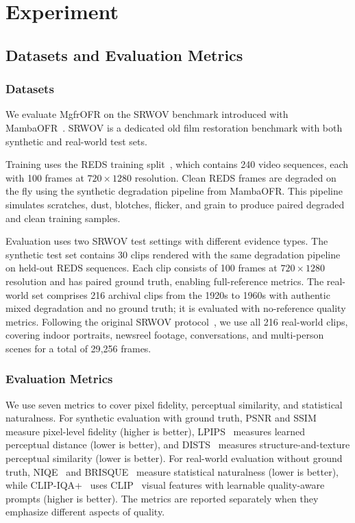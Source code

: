 \section{Experiment}
\label{sec:experiment}

\subsection{Datasets and Evaluation Metrics}
\label{subsec:datasets_metrics}

\subsubsection{Datasets}
\label{subsec:datasets}

We evaluate MgfrOFR on the SRWOV benchmark introduced with MambaOFR~\cite{mao2025mambaofr}. SRWOV is a dedicated old film restoration benchmark with both synthetic and real-world test sets.

Training uses the REDS training split~\cite{nah2019reds}, which contains 240 video sequences, each with 100 frames at $720 \times 1280$ resolution. Clean REDS frames are degraded on the fly using the synthetic degradation pipeline from MambaOFR. This pipeline simulates scratches, dust, blotches, flicker, and grain to produce paired degraded and clean training samples.

Evaluation uses two SRWOV test settings with different evidence types. The synthetic test set contains 30 clips rendered with the same degradation pipeline on held-out REDS sequences. Each clip consists of 100 frames at $720 \times 1280$ resolution and has paired ground truth, enabling full-reference metrics. The real-world set comprises 216 archival clips from the 1920s to 1960s with authentic mixed degradation and no ground truth; it is evaluated with no-reference quality metrics. Following the original SRWOV protocol~\cite{mao2025mambaofr}, we use all 216 real-world clips, covering indoor portraits, newsreel footage, conversations, and multi-person scenes for a total of 29{,}256 frames.

\subsubsection{Evaluation Metrics}
\label{subsec:eval_metrics}

We use seven metrics to cover pixel fidelity, perceptual similarity, and statistical naturalness. For synthetic evaluation with ground truth, PSNR and SSIM~\cite{wang2004ssim} measure pixel-level fidelity (higher is better), LPIPS~\cite{zhang2018lpips} measures learned perceptual distance (lower is better), and DISTS~\cite{ding2020dists} measures structure-and-texture perceptual similarity (lower is better). For real-world evaluation without ground truth, NIQE~\cite{mittal2012niqe} and BRISQUE~\cite{mittal2012brisque} measure statistical naturalness (lower is better), while CLIP-IQA+~\cite{wang2023clipiqa} uses CLIP~\cite{radford2021clip} visual features with learnable quality-aware prompts (higher is better). The metrics are reported separately when they emphasize different aspects of quality.

